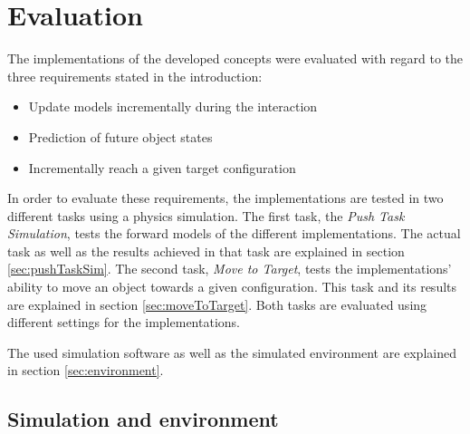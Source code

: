 \chapter{Evaluation\label{chap:evaluation}}



The implementations of the developed concepts were evaluated with regard to the three requirements stated in the introduction: 

\begin{itemize}
\item Update models incrementally during the interaction
\item Prediction of future object states
\item Incrementally reach a given target configuration
\end{itemize}

In order to evaluate these requirements, the implementations are tested in two different tasks using a physics simulation. The first task, the \textit{Push Task Simulation}, tests the forward models of the different implementations. The actual task as well as the results achieved in that task are explained in section \ref{sec:pushTaskSim}.
The second task, \textit{Move to Target}, tests the implementations' ability to move an object towards a given configuration. This task and its results are explained in section \ref{sec:moveToTarget}.
Both tasks are evaluated using different settings for the implementations.

The used simulation software as well as the simulated environment are explained in section \ref{sec:environment}.


\section{Simulation and environment \label{sec:environment}} 

